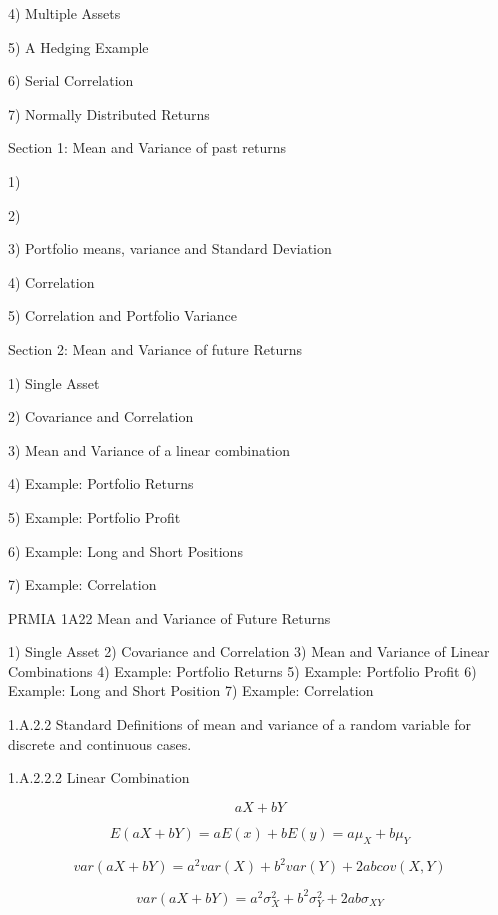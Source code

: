 4) Multiple Assets

5) A Hedging Example

6) Serial Correlation

7) Normally Distributed Returns 


Section 1: Mean and Variance of past returns


1)

2) 

3) Portfolio means, variance and Standard Deviation

4) Correlation

5) Correlation and Portfolio Variance


Section 2: Mean and Variance of future Returns


1) Single Asset

2) Covariance and Correlation

3) Mean and Variance of a linear combination

4) Example: Portfolio Returns

5) Example: Portfolio Profit

6) Example: Long and Short Positions

7) Example: Correlation


PRMIA 1A22 Mean and Variance of Future Returns

1) Single Asset
2) Covariance and Correlation
3) Mean and Variance of Linear Combinations
4) Example: Portfolio Returns
5) Example: Portfolio Profit
6) Example: Long and Short Position
7) Example: Correlation

1.A.2.2 Standard Definitions of mean and variance of a random variable for 
discrete and continuous cases.

1.A.2.2.2
Linear Combination

\[aX+bY\]

\[E(aX+bY) = aE(x) + bE(y) = a\mu_X + b\mu_Y\]



\[var(aX+bY) =  a^2 var(X) + b^2 var(Y)  +2ab cov(X,Y)\]


\[var(aX+bY) =  a^2 \sigma^2_X + b^2 \sigma^2_Y  +2ab \sigma_{XY}\]

